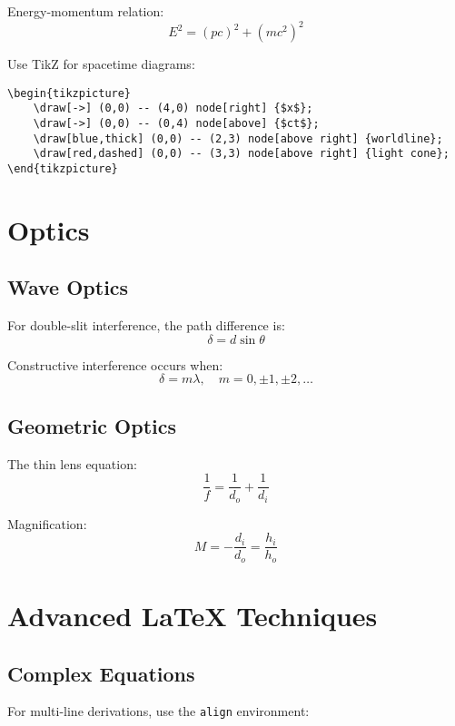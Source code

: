 \documentclass[11pt]{book}
\begin{document}
Energy-momentum relation:
\[ E^2 = (pc)^2 + (mc^2)^2 \]

\begin{tutorialbox}[title=Creating Spacetime Diagrams]
Use TikZ for spacetime diagrams:
\begin{verbatim}
\begin{tikzpicture}
    \draw[->] (0,0) -- (4,0) node[right] {$x$};
    \draw[->] (0,0) -- (0,4) node[above] {$ct$};
    \draw[blue,thick] (0,0) -- (2,3) node[above right] {worldline};
    \draw[red,dashed] (0,0) -- (3,3) node[above right] {light cone};
\end{tikzpicture}
\end{verbatim}
\end{tutorialbox}

\chapter{Optics}

\section{Wave Optics}

For double-slit interference, the path difference is:
\[ \delta = d\sin\theta \]

Constructive interference occurs when:
\[ \delta = m\lambda, \quad m = 0, \pm 1, \pm 2, \ldots \]

\section{Geometric Optics}

The thin lens equation:
\[ \frac{1}{f} = \frac{1}{d_o} + \frac{1}{d_i} \]

Magnification:
\[ M = -\frac{d_i}{d_o} = \frac{h_i}{h_o} \]

\backmatter

\appendix

\chapter{Advanced LaTeX Techniques}

\section{Complex Equations}

For multi-line derivations, use the \texttt{align} environment:
\end{document}
